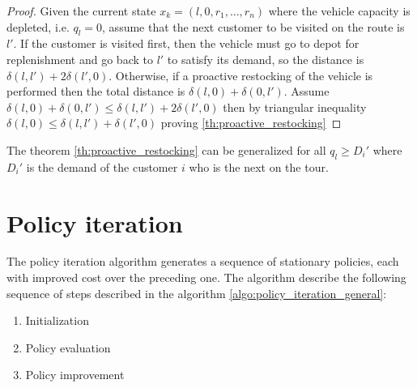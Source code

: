 \begin{proof}
Given the current state $x_k=(l,0,r_1,\ldots, r_n)$ where the vehicle capacity is depleted, i.e. $q_l = 0$, assume that the next customer to be visited on the route is $l'$. If the customer is visited first, then the vehicle must go to depot for replenishment and go back to $l'$ to satisfy its demand, so the distance is $\delta(l,l')+2\delta(l',0)$. Otherwise, if a proactive restocking of the vehicle is performed then the total distance is $\delta(l,0)+\delta(0,l')$.
Assume $\delta(l,0)+\delta(0,l') \leq \delta(l,l')+2\delta(l',0)$ then by triangular inequality $\delta(l,0) \leq \delta(l,l')+\delta(l',0)$ proving \ref{th:proactive_restocking}
\end{proof}

\begin{lemma}%
 The theorem \ref{th:proactive_restocking} can be generalized for all $q_l \geq D_i'$ where $D_i'$ is the demand of the customer $i$ who is the next on the tour.
\end{lemma}











\section{Policy iteration}

The policy iteration algorithm generates a sequence of stationary policies, each with improved cost over the preceding one. The algorithm describe the following sequence of steps described in the algorithm \ref{algo:policy_iteration_general}:

\begin{enumerate}
 \item Initialization
 \item Policy evaluation
 \item Policy improvement
\end{enumerate}

